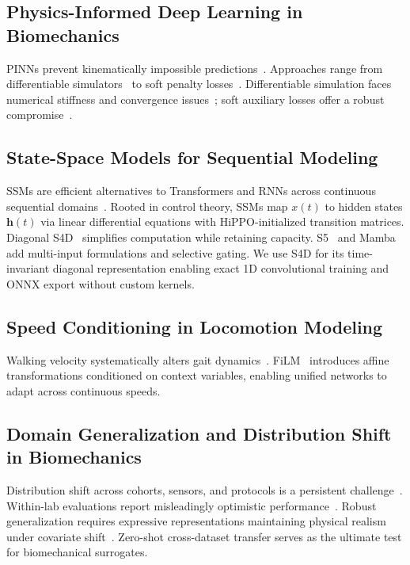 \documentclass[journal]{IEEEtran}
\begin{document}
\subsection{Physics-Informed Deep Learning in Biomechanics}
PINNs prevent kinematically impossible predictions~\cite{karniadakis2021physics}. Approaches range from differentiable simulators~\cite{werling2021fast} to soft penalty losses~\cite{dorschky2019cnn, stanev2020learning}. Differentiable simulation faces numerical stiffness and convergence issues~\cite{werling2021fast}; soft auxiliary losses offer a robust compromise~\cite{dorschky2019cnn}.

\subsection{State-Space Models for Sequential Modeling}
SSMs are efficient alternatives to Transformers and RNNs across continuous sequential domains~\cite{goel2022s, gu2022parameterization}. Rooted in control theory, SSMs map $x(t)$ to hidden states $\mathbf{h}(t)$ via linear differential equations with HiPPO-initialized transition matrices. Diagonal S4D~\cite{gu2022parameterization} simplifies computation while retaining capacity. S5~\cite{smith2023s5} and Mamba~\cite{gu2024mamba} add multi-input formulations and selective gating. We use S4D for its time-invariant diagonal representation enabling exact 1D convolutional training and ONNX export without custom kernels.

\subsection{Speed Conditioning in Locomotion Modeling}
Walking velocity systematically alters gait dynamics~\cite{bohannon2011comfortable}. FiLM~\cite{perez2018film} introduces affine transformations conditioned on context variables, enabling unified networks to adapt across continuous speeds.

\subsection{Domain Generalization and Distribution Shift in Biomechanics}
Distribution shift across cohorts, sensors, and protocols is a persistent challenge~\cite{halilaj2018machine, gholami2020subject}. Within-lab evaluations report misleadingly optimistic performance~\cite{mundt2021estimation}. Robust generalization requires expressive representations maintaining physical realism under covariate shift~\cite{young2017state}. Zero-shot cross-dataset transfer serves as the ultimate test for biomechanical surrogates.
\end{document}
